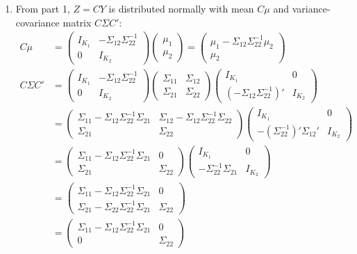 \documentclass{article}[12pt]
\begin{document}
\begin{enumerate}
	\item From part 1, $Z = CY$ is distributed normally with mean $C \mu$ and variance-covariance matrix $C \Sigma C'$:
	\begin{align*}
		C \mu &=
			\begin{pmatrix} I_{K_1} & -\Sigma_{12}\Sigma_{22}^{-1} \\ 0 & I_{K_2} \end{pmatrix}
			\begin{pmatrix} \mu_1 \\ \mu_2 \end{pmatrix}
		= \begin{pmatrix} \mu_1 - \Sigma_{12} \Sigma_{22}^{-1} \mu_2 \\ \mu_2 \end{pmatrix} \\
		C \Sigma C' &=
			\begin{pmatrix} I_{K_1} & -\Sigma_{12}\Sigma_{22}^{-1} \\ 0 & I_{K_2} \end{pmatrix}
			\begin{pmatrix} \Sigma_{11} &\Sigma_{12} \\ \Sigma_{21} & \Sigma_{22} \end{pmatrix}
			\begin{pmatrix} I_{K_1} & 0 \\ (-\Sigma_{12}\Sigma_{22}^{-1})' & I_{K_2} \end{pmatrix} \\
		&=	\begin{pmatrix} \Sigma_{11} - \Sigma_{12}\Sigma_{22}^{-1}\Sigma_{21} & \Sigma_{12} - \Sigma_{12}\Sigma_{22}^{-1} \Sigma_{22} \\ \Sigma_{21} & \Sigma_{22} \end{pmatrix}
			\begin{pmatrix} I_{K_1} & 0 \\ -(\Sigma_{22}^{-1})' \Sigma_{12}' & I_{K_2} \end{pmatrix} \\
		&=	\begin{pmatrix} \Sigma_{11} - \Sigma_{12}\Sigma_{22}^{-1}\Sigma_{21} & 0 \\ \Sigma_{21} & \Sigma_{22} \end{pmatrix}
			\begin{pmatrix} I_{K_1} & 0 \\ -\Sigma_{22}^{-1} \Sigma_{21} & I_{K_2} \end{pmatrix} \\
		&=	\begin{pmatrix} \Sigma_{11} - \Sigma_{12}\Sigma_{22}^{-1}\Sigma_{21} & 0 \\ \Sigma_{21} - \Sigma_{22}\Sigma_{22}^{-1}\Sigma_{21} & \Sigma_{22} \end{pmatrix} \\
		&=	\begin{pmatrix} \Sigma_{11} - \Sigma_{12}\Sigma_{22}^{-1}\Sigma_{21} & 0 \\ 0 & \Sigma_{22} \end{pmatrix}
	\end{align*}


\end{enumerate}
\end{document}
